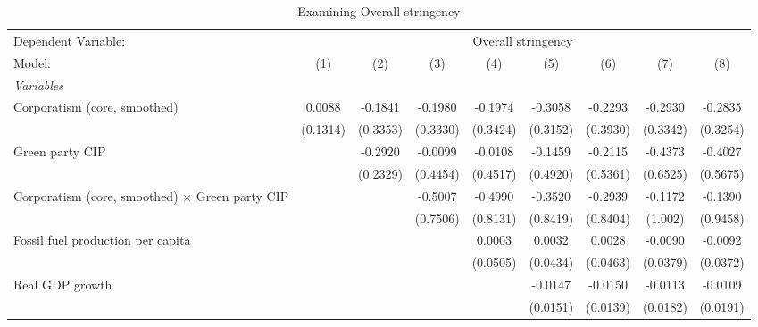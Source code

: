 
\begin{table}[htbp]
   \caption{Examining Overall stringency}
   \centering
   \begin{tabular}{lcccccccc}
      \tabularnewline \midrule \midrule
      Dependent Variable: & \multicolumn{8}{c}{Overall stringency}\\
      Model:                                                 & (1)                   & (2)      & (3)      & (4)      & (5)      & (6)      & (7)      & (8)\\  
      \midrule
      \emph{Variables}\\
      Corporatism (core, smoothed)                           & 0.0088                & -0.1841  & -0.1980  & -0.1974  & -0.3058  & -0.2293  & -0.2930  & -0.2835\\   
                                                             & (0.1314)              & (0.3353) & (0.3330) & (0.3424) & (0.3152) & (0.3930) & (0.3342) & (0.3254)\\   
      Green party CIP                                        &                       & -0.2920  & -0.0099  & -0.0108  & -0.1459  & -0.2115  & -0.4373  & -0.4027\\   
                                                             &                       & (0.2329) & (0.4454) & (0.4517) & (0.4920) & (0.5361) & (0.6525) & (0.5675)\\   
      Corporatism (core, smoothed) $\times$ Green party CIP  &                       &          & -0.5007  & -0.4990  & -0.3520  & -0.2939  & -0.1172  & -0.1390\\   
                                                             &                       &          & (0.7506) & (0.8131) & (0.8419) & (0.8404) & (1.002)  & (0.9458)\\   
      Fossil fuel production per capita                      &                       &          &          & 0.0003   & 0.0032   & 0.0028   & -0.0090  & -0.0092\\   
                                                             &                       &          &          & (0.0505) & (0.0434) & (0.0463) & (0.0379) & (0.0372)\\   
      Real GDP growth                                        &                       &          &          &          & -0.0147  & -0.0150  & -0.0113  & -0.0109\\   
                                                             &                       &          &          &          & (0.0151) & (0.0139) & (0.0182) & (0.0191)\\   

\end{tabular}
\end{table}

